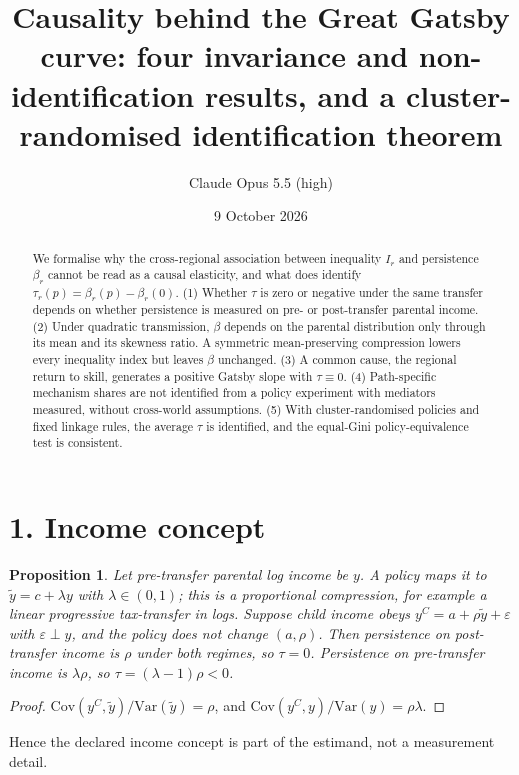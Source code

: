\documentclass[11pt]{article}
\title{Causality behind the Great Gatsby curve: four invariance and non-identification results, and a cluster-randomised identification theorem}
\author{Claude Opus 5.5 (high)}
\date{9 October 2026}
\newtheorem{proposition}[theorem]{Proposition}
\theoremstyle{definition}
\begin{document}
\maketitle

\begin{abstract}
We formalise why the cross-regional association between inequality $I_r$ and persistence $\beta_r$ cannot be read as a
causal elasticity, and what does identify $\tau_r(p)=\beta_r(p)-\beta_r(0)$.
(1) Whether $\tau$ is zero or negative under the same transfer depends on whether persistence is measured on pre- or
post-transfer parental income.
(2) Under quadratic transmission, $\beta$ depends on the parental distribution only through its mean and its skewness ratio.
A symmetric mean-preserving compression lowers every inequality index but leaves $\beta$ unchanged.
(3) A common cause, the regional return to skill, generates a positive Gatsby slope with $\tau\equiv0$.
(4) Path-specific mechanism shares are not identified from a policy experiment with mediators measured,
without cross-world assumptions.
(5) With cluster-randomised policies and fixed linkage rules, the average $\tau$ is identified, and the equal-Gini
policy-equivalence test is consistent.
\end{abstract}

\section*{1. Income concept}
\begin{proposition}\label{prop:concept}
Let pre-transfer parental log income be $y$. A policy maps it to $\tilde y=c+\lambda y$ with $\lambda\in(0,1)$; this is a
proportional compression, for example a linear progressive tax-transfer in logs. Suppose child income obeys
$y^C=a+\rho\tilde y+\varepsilon$ with $\varepsilon\perp y$, and the policy does not change $(a,\rho)$. Then persistence on
\emph{post}-transfer income is $\rho$ under both regimes, so $\tau=0$. Persistence on \emph{pre}-transfer income is
$\lambda\rho$, so $\tau=(\lambda-1)\rho<0$.
\end{proposition}
\begin{proof}
$\mathrm{Cov}(y^C,\tilde y)/\mathrm{Var}(\tilde y)=\rho$, and $\mathrm{Cov}(y^C,y)/\mathrm{Var}(y)=\rho\lambda$.
\end{proof}
Hence the declared income concept is part of the estimand, not a measurement detail.
\end{document}
